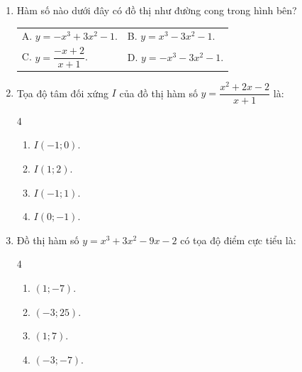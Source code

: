 \documentclass[12pt]{article}
\begin{document}
\begin{enumerate}[label=\textbf{Câu \arabic*.}, leftmargin=*]
		\item Hàm số nào dưới đây có đồ thị như đường cong trong hình bên?
		
		\begin{center}
		\end{center}
		
		\begin{center}
			\begin{tabular}{p{0.47\textwidth} p{}}
				A. $y=-x^3+3x^2-1$. &
				B. $y=x^3-3x^2-1$. \\[2mm]
				C. $y=\dfrac{-x+2}{x+1}$. &
				D. $y=-x^3-3x^2-1$.
			\end{tabular}
		\end{center}
		
		\item Tọa độ tâm đối xứng $I$ của đồ thị hàm số $y = \dfrac{x^2+2x-2}{x+1}$ là:
		\begin{multicols}{4}
			\begin{enumerate}[label=\Alph*.]
				\item $I(-1; 0)$.
				\item $I(1; 2)$.
				\item $I(-1; 1)$.
				\item $I(0; -1)$.
			\end{enumerate}
		\end{multicols}
		
		\item Đồ thị hàm số $y = x^3 + 3x^2 - 9x - 2$ có tọa độ điểm cực tiểu là:
		\begin{multicols}{4}
			\begin{enumerate}[label=\Alph*.]
				\item $(1; -7)$.
				\item $(-3; 25)$.
				\item $(1; 7)$.
				\item $(-3; -7)$.
			\end{enumerate}
		\end{multicols}
		

\end{enumerate}
\end{document}
